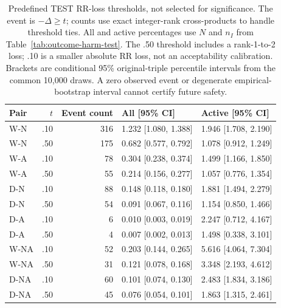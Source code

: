 \begin{table}[htbp]
\centering\footnotesize\setlength{\tabcolsep}{3pt}
\caption{Predefined TEST RR-loss thresholds, not selected for significance. The event is $-\Delta\geq t$; counts use exact integer-rank cross-products to handle threshold ties. All and active percentages use $N$ and $n_I$ from Table~\ref{tab:outcome-harm-test}. The .50 threshold includes a rank-1-to-2 loss; .10 is a smaller absolute RR loss, not an acceptability calibration. Brackets are conditional 95\% original-triple percentile intervals from the common 10,000 draws. A zero observed event or degenerate empirical-bootstrap interval cannot certify future safety.}
\label{tab:outcome-severe}
\begin{tabular}{lrrll}
\toprule
Pair & $t$ & Event count & All [95\% CI] & Active [95\% CI]\\
\midrule
W-N & .10 & 316 & 1.232 [1.080, 1.388] & 1.946 [1.708, 2.190]\\
W-N & .50 & 175 & 0.682 [0.577, 0.792] & 1.078 [0.912, 1.249]\\
W-A & .10 & 78 & 0.304 [0.238, 0.374] & 1.499 [1.166, 1.850]\\
W-A & .50 & 55 & 0.214 [0.156, 0.277] & 1.057 [0.776, 1.354]\\
D-N & .10 & 88 & 0.148 [0.118, 0.180] & 1.881 [1.494, 2.279]\\
D-N & .50 & 54 & 0.091 [0.067, 0.116] & 1.154 [0.850, 1.466]\\
D-A & .10 & 6 & 0.010 [0.003, 0.019] & 2.247 [0.712, 4.167]\\
D-A & .50 & 4 & 0.007 [0.002, 0.013] & 1.498 [0.338, 3.101]\\
W-NA & .10 & 52 & 0.203 [0.144, 0.265] & 5.616 [4.064, 7.304]\\
W-NA & .50 & 31 & 0.121 [0.078, 0.168] & 3.348 [2.193, 4.612]\\
D-NA & .10 & 60 & 0.101 [0.074, 0.130] & 2.483 [1.834, 3.186]\\
D-NA & .50 & 45 & 0.076 [0.054, 0.101] & 1.863 [1.315, 2.461]\\
\bottomrule
\end{tabular}
\end{table}
